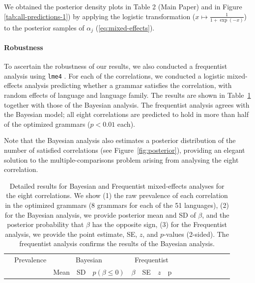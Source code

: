 \documentclass[10pt,twoside,lineno]{article}
\begin{document}
We obtained the posterior density plots in Table 2 (Main Paper) and in Figure \ref{tab:all-predictions-1}) by applying the logistic transformation ($x \mapsto \frac{1}{1+\exp(-x)}$) to the posterior samples of $\alpha_j$ (\ref{eq:mixed-effects}).





\paragraph{Robustness}
To ascertain the robustness of our results, we also conducted a frequentist analysis using \texttt{lme4} \cite{bates2015fitting}.
For each of the correlations, we conducted a logistic mixed-effects analysis predicting whether a grammar satisfies the correlation, with random effects of language and language family.
The results are shown in Table~\ref{tab:corr-regression} together with those of the Bayesian analysis.
The frequentist analysis agrees with the Bayesian model; all eight correlations are predicted to hold in more than half of the optimized grammars ($p < 0.01$ each).

Note that the Bayesian analysis  also estimates a posterior distribution of the number of satisfied correlations (see Figure~\ref{fig:posterior}), providing an elegant solution to the multiple-comparisons problem arising from analysing the eight correlation.





\begin{table}
\small{
\begin{center}
\begin{tabular}{|l||l|lll|llll|ll|llllll}
\hline
 & Prevalence & \multicolumn{3}{c|}{Bayesian} & \multicolumn{4}{c|}{Frequentist} \\ 
& & Mean & SD & $p(\beta \leq 0)$ & $\beta$ & SE & $z$ & p \\
\hline\hline
	
\hline
\end{tabular}
\end{center}
}
	\caption{Detailed results for Bayesian and Frequentist mixed-effects analyses for the eight correlations. 
We show (1) the raw prevalence of each correlation in the optimized grammars (8 grammars for each of the 51 languages),
(2) for the Bayesian analysis, we provide posterior mean and SD of $\beta$, and the posterior probability that $\beta$ has the opposite sign,
(3) for the Frequentist analysis, we provide the point estimate, SE, $z$, and $p$-values (2-sided).
The frequentist analysis confirms the results of the Bayesian analysis.
}\label{tab:corr-regression}
\end{table}
\end{document}
